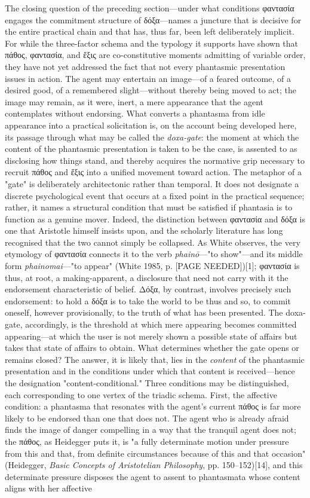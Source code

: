 \documentclass{article}
\begin{document}
The closing question of the preceding section—under what conditions φαντασία engages the commitment structure of δόξα—names a juncture that is decisive for the entire practical chain and that has, thus far, been left deliberately implicit. For while the three-factor schema and the typology it supports have shown that πάθος, φαντασία, and ἕξις are co-constitutive moments admitting of variable order, they have not yet addressed the fact that not every phantasmic presentation issues in action. The agent may entertain an image—of a feared outcome, of a desired good, of a remembered slight—without thereby being moved to act; the image may remain, as it were, inert, a mere appearance that the agent contemplates without endorsing. What converts a phantasma from idle appearance into a practical solicitation is, on the account being developed here, its passage through what may be called the \textit{doxa-gate}: the moment at which the content of the phantasmic presentation is taken to be the case, is assented to as disclosing how things stand, and thereby acquires the normative grip necessary to recruit πάθος and ἕξις into a unified movement toward action. The metaphor of a "gate" is deliberately architectonic rather than temporal. It does not designate a discrete psychological event that occurs at a fixed point in the practical sequence; rather, it names a structural condition that must be satisfied if phantasia is to function as a genuine mover. Indeed, the distinction between φαντασία and δόξα is one that Aristotle himself insists upon, and the scholarly literature has long recognised that the two cannot simply be collapsed. As White observes, the very etymology of φαντασία connects it to the verb \textit{phainō}—"to show"—and its middle form \textit{phainomai}—"to appear" (White 1985, p. [PAGE NEEDED])[1]; φαντασία is thus, at root, a making-apparent, a disclosure that need not carry with it the endorsement characteristic of belief. Δόξα, by contrast, involves precisely such endorsement: to hold a δόξα is to take the world to be thus and so, to commit oneself, however provisionally, to the truth of what has been presented. The doxa-gate, accordingly, is the threshold at which mere appearing becomes committed appearing—at which the user is not merely shown a possible state of affairs but takes that state of affairs to obtain. What determines whether the gate opens or remains closed? The answer, it is likely that, lies in the \textit{content} of the phantasmic presentation and in the conditions under which that content is received—hence the designation "content-conditional." Three conditions may be distinguished, each corresponding to one vertex of the triadic schema. First, the affective condition: a phantasma that resonates with the agent's current πάθος is far more likely to be endorsed than one that does not. The agent who is already afraid finds the image of danger compelling in a way that the tranquil agent does not; the πάθος, as Heidegger puts it, is "a fully determinate motion under pressure from this and that, from definite circumstances because of this and that occasion" (Heidegger, \textit{Basic Concepts of Aristotelian Philosophy}, pp. 150–152)[14], and this determinate pressure disposes the agent to assent to phantasmata whose content aligns with her affective 
\end{document}
